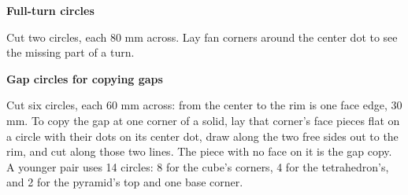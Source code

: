 \documentclass[11pt,letterpaper]{article}
\begin{document}
\vspace{1cm}
\textbf{Full-turn circles}\par
Cut two circles, each 80 mm across. Lay fan corners around the center dot to see the missing part of a turn.
\begin{center}
\end{center}
\newpage
\textbf{Gap circles for copying gaps}\par
Cut six circles, each 60 mm across: from the center to the rim is one face edge, 30 mm. To copy the gap at one corner of a solid, lay that corner's face pieces flat on a circle with their dots on its center dot, draw along the two free sides out to the rim, and cut along those two lines. The piece with no face on it is the gap copy. A younger pair uses 14 circles: 8 for the cube's corners, 4 for the tetrahedron's, and 2 for the pyramid's top and one base corner.
\begin{center}
\end{center}
\end{document}
